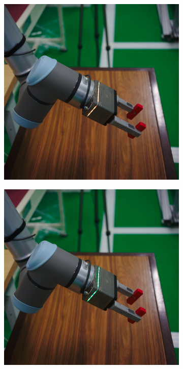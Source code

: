 \begin{figure}[h]
\begin{subfigure}{.2\linewidth}
    \end{subfigure}%
    \begin{subfigure}{.2\linewidth}
        \centering
        \includegraphics[width=.95\linewidth]{figs/chp5/grip_yellow.jpg}
    \end{subfigure}%
    \begin{subfigure}{.2\linewidth}
        \centering
        \includegraphics[width=.95\linewidth]{figs/chp5/grip_green.jpg}

\end{subfigure}
\end{figure}
